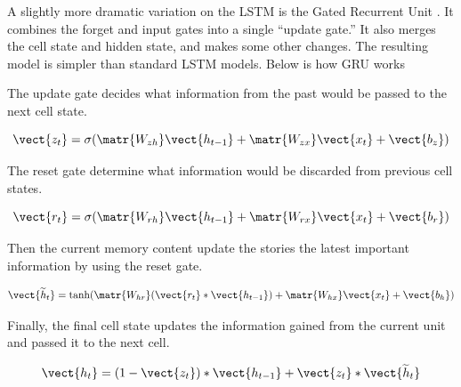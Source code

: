 A slightly more dramatic variation on the LSTM is the Gated Recurrent Unit \cite{1406.1078}.
It combines the forget and input gates into a single “update gate.” 
It also merges the cell state and hidden state, and makes some other changes. 
The resulting model is simpler than standard LSTM models.
Below is how GRU works

The update gate decides what information from the past would be passed to the next cell state.

\[\vect{z_t} = \sigma(\matr{W_{zh}}\vect{h_{t-1}}+\matr{W_{zx}}\vect{x_t} + \vect{b_z}) \]

The reset gate determine what information would be discarded from previous cell states.

\[\vect{r_t} = \sigma(\matr{W_{rh}}\vect{h_{t-1}}+\matr{W_{rx}}\vect{x_t} + \vect{b_r}) \]

Then the current memory content update the stories the latest important information by using the reset gate.

\[\vect{\widetilde{h}_t} = \tanh(\matr{W_{hr}}(\vect{r_t}*\vect{h_{t-1}}) + \matr{W_{hx}}\vect{x_t} + \vect{b_h})\]

Finally, the final cell state updates the information gained from the current unit and passed it to the next cell.

\[\vect{h_t} = (1-\vect{z_t})*\vect{h_{t-1}} + \vect{z_t}*\vect{\widetilde{h}_t}\]